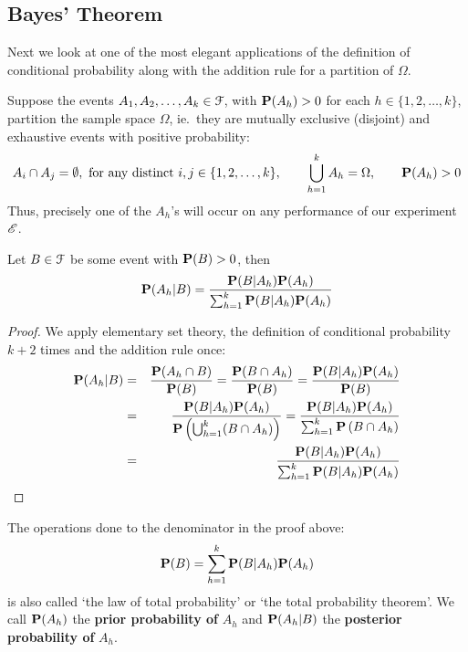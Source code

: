 \subsection{Bayes' Theorem}\label{S:BayesTheorem}
 Next we look at one of the most elegant applications of the definition of conditional probability along with the addition rule for a partition of $\Omega$.
 \begin{prop}
 Suppose the events $A_1,A_2,\ldots,A_k \in \mathcal{F}$, with $\mathbf{P}(A_h)>0$ for each $h \in \{1,2,\ldots,k\}$, partition the sample space $\Omega$, ie.~they are mutually exclusive (disjoint) and exhaustive events with positive probability: 
 \[
 A_i \cap A_j = \emptyset, \ \text{for any distinct $i,j \in \{1,2,\ldots,k\}$}, \qquad \bigcup_{h=1}^k A_h = \Omega, \qquad \mathbf{P}(A_h) > 0
 \]
 Thus, precisely one of the $A_h$'s will occur on any performance of our experiment $\mathscr{E}$.  
 
 Let $B \in \mathcal{F}$ be some event with $\mathbf{P}(B) > 0$, then 
 \begin{equation}\label{E:BayesThm}
 \mathbf{P}(A_h|B) = \frac{\mathbf{P}(B|A_h) \mathbf{P}(A_h)}{\sum_{h=1}^k \mathbf{P}(B|A_h) \mathbf{P}(A_h)}
 \end{equation}
 {\scriptsize
 \begin{proof}
 We apply elementary set theory, the definition of conditional probability $k+2$ times and the addition rule once:
 \begin{eqnarray}
 \mathbf{P}(A_h | B) &=& \frac{\mathbf{P}(A_h \cap B)}{\mathbf{P}(B)} = \frac{\mathbf{P}( B \cap A_h)}{\mathbf{P}(B)} = 
 \frac{\mathbf{P}( B | A_h) \mathbf{P}(A_h)}{\mathbf{P}(B)}  \notag \\
 &=& \frac{\mathbf{P}( B | A_h) \mathbf{P}(A_h)}{\mathbf{P} \left( \bigcup_{h=1}^k (B \cap A_h) \right)} =
 \frac{\mathbf{P}( B | A_h) \mathbf{P}(A_h)}{\sum_{h=1}^k \mathbf{P} \left( B \cap A_h \right)} \notag \\
 &=& \frac{\mathbf{P}( B | A_h) \mathbf{P}(A_h)}{\sum_{h=1}^k \mathbf{P}(B | A_h) \mathbf{P}(A_h)} \notag
 \end{eqnarray}
 \end{proof}
}
The operations done to the denominator in the proof above:
\begin{equation}\label{E:LTP}
\mathbf{P}( B) = \sum_{h=1}^k \mathbf{P}(B | A_h) \mathbf{P}(A_h)
\end{equation}
is also called `the law of total probability' or `the total probability theorem'.  
We call $\mathbf{P}(A_h)$ the {\bf prior probability of} $A_h$ and $\mathbf{P}(A_h|B)$ the {\bf posterior probability of} $A_h$.
 \end{prop}

